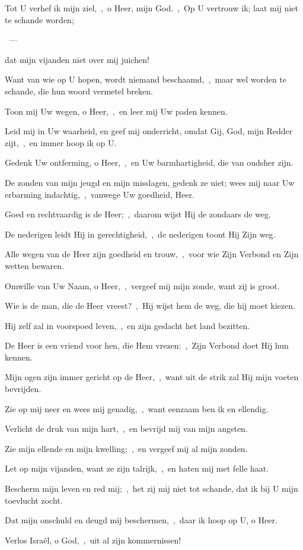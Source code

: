 \documentclass[12pt,twoside,a5paper]{article}
\begin{document}

\begin{halfparskip}
   Tot U verhef ik mijn ziel,~\sep\ o Heer, mijn God.~\sep\ Op U vertrouw ik; laat mij niet te schande worden;

  ~--- 

  dat mijn vijanden niet over mij juichen!

  Want van wie op U hopen, wordt niemand beschaamd,~\sep\ maar wel worden te schande, die hun woord vermetel breken.

  Toon mij Uw wegen, o Heer,~\sep\ en leer mij Uw paden kennen.

  Leid mij in Uw waarheid, en geef mij onderricht, omdat Gij, God, mijn Redder zijt,~\sep\ en immer hoop ik op U.

  Gedenk Uw ontferming, o Heer,~\sep\ en Uw barmhartigheid, die van oudsher zijn.

  De zonden van mijn jeugd en mijn misslagen, gedenk ze niet; wees mij naar Uw erbarming indachtig,~\sep\ vanwege Uw goedheid, Heer.

  Goed en rechtvaardig is de Heer;~\sep\ daarom wijst Hij de zondaars de weg.

  De nederigen leidt Hij in gerechtigheid,~\sep\ de nederigen toont Hij Zijn weg.

  Alle wegen van de Heer zijn goedheid en trouw,~\sep\ voor wie Zijn Verbond en Zijn wetten bewaren.

  Omwille van Uw Naam, o Heer,~\sep\ vergeef mij mijn zonde, want zij is groot.

  Wie is de man, die de Heer vreest?~\sep\ Hij wijst hem de weg, die hij moet kiezen.

  Hij zelf zal in voorspoed leven,~\sep\ en zijn geslacht het land bezitten.

  De Heer is een vriend voor hen, die Hem vrezen:~\sep\ Zijn Verbond doet Hij hun kennen.

  Mijn ogen zijn immer gericht op de Heer,~\sep\ want uit de strik zal Hij mijn voeten bevrijden.

  Zie op mij neer en wees mij genadig,~\sep\ want eenzaam ben ik en ellendig.

  Verlicht de druk van mijn hart,~\sep\ en bevrijd mij van mijn angsten.

  Zie mijn ellende en mijn kwelling;~\sep\ en vergeef mij al mijn zonden.

  Let op mijn vijanden, want ze zijn talrijk,~\sep\ en haten mij met felle haat.

  Bescherm mijn leven en red mij;~\sep\ het zij mij niet tot schande, dat ik bij U mijn toevlucht zocht.

  Dat mijn onschuld en deugd mij beschermen,~\sep\ daar ik hoop op U, o Heer.

  Verlos Israël, o God,~\sep\ uit al zijn kommernissen!
\end{halfparskip}
\end{document}

